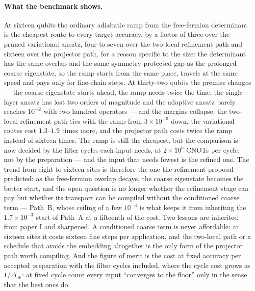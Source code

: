 \documentclass[a4paper,11pt,noarxiv]{quantumarticle}
\newcommand{\Deff}{\Delta_{\mathrm{eff}}}
\begin{document}
\paragraph{What the benchmark shows.}
At sixteen qubits the ordinary adiabatic ramp from the free-fermion
determinant is the cheapest route to every target accuracy, by a factor of
three over the pruned variational ansatz, four to seven over the two-local
refinement path and sixteen over the projector path, for a reason specific
to the size: the determinant has the same overlap and the same
symmetry-protected gap as the prolonged coarse eigenstate, so the ramp
starts from the same place, travels at the same speed and pays only for
fine-chain steps.  At thirty-two qubits the premise changes --- the coarse
eigenstate starts ahead, the ramp needs twice the time, the single-layer
ansatz has lost two orders of magnitude and the adaptive ansatz barely
reaches $10^{-2}$ with two hundred operators --- and the margins collapse:
the two-local refinement path ties with the ramp from $3\times10^{-3}$
down, the variational routes cost $1.3$--$1.9$ times more, and the projector
path costs twice the ramp instead of sixteen times.  The ramp is still the
cheapest, but the comparison is now decided by the filter cycles each
input needs, at $2\times10^5$ CNOTs per cycle, not by the preparation
--- and the input that needs fewest is the refined one.  The trend from
eight to sixteen sites is therefore the one the refinement proposal
predicted: as the free-fermion overlap decays, the coarse eigenstate
becomes the better start, and the open question is no longer whether the
refinement stage can pay but whether its transport can be compiled without
the conditioned coarse term --- Path~B, whose ceiling of a few $10^{-3}$ is
what keeps it from inheriting the $1.7\times10^{-3}$ start of Path~A at a
fifteenth of the cost.  Two lessons are
inherited from paper I and sharpened.  A conditioned coarse term is never
affordable: at sixteen sites it costs sixteen fine steps per application,
and the two-local path or a schedule that avoids the embedding altogether
is the only form of the projector path worth compiling.  And the figure of
merit is the cost at fixed accuracy per accepted preparation with the
filter cycles included, where the cycle cost grows as $1/\Deff$: at fixed
cycle count every input ``converges to the floor'' only in the sense that
the best ones do.
\end{document}
